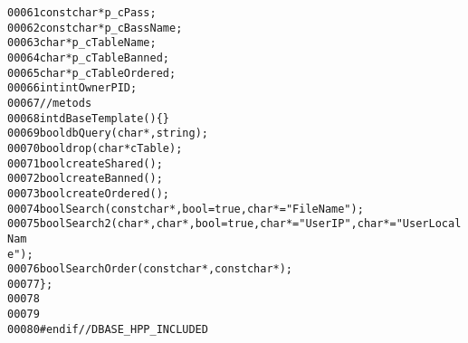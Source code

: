 \begin{footnotesize}
\begin{alltt}
00061         \textcolor{keyword}{const} \textcolor{keywordtype}{char} *p\_cPass; 
00062         \textcolor{keyword}{const} \textcolor{keywordtype}{char} *p\_cBassName; 
00063         \textcolor{keywordtype}{char} *p\_cTableName; 
00064         \textcolor{keywordtype}{char} *p\_cTableBanned; 
00065         \textcolor{keywordtype}{char} *p\_cTableOrdered;
00066         \textcolor{keywordtype}{int} intOwnerPID; 
00067         \textcolor{comment}{//metods}
00068         \textcolor{keywordtype}{int} dBaseTemplate()\{\}
00069         \textcolor{keywordtype}{bool} dbQuery(\textcolor{keywordtype}{char} *,\textcolor{keywordtype}{string});
00070         \textcolor{keywordtype}{bool} drop(\textcolor{keywordtype}{char} *cTable);
00071         \textcolor{keywordtype}{bool} createShared();
00072         \textcolor{keywordtype}{bool} createBanned();
00073         \textcolor{keywordtype}{bool} createOrdered();
00074         \textcolor{keywordtype}{bool} Search(\textcolor{keyword}{const} \textcolor{keywordtype}{char} *,\textcolor{keywordtype}{bool} =\textcolor{keyword}{true},\textcolor{keywordtype}{char} * =\textcolor{stringliteral}{"FileName"});
00075         \textcolor{keywordtype}{bool} Search2(\textcolor{keywordtype}{char} *,\textcolor{keywordtype}{char}*,\textcolor{keywordtype}{bool} =\textcolor{keyword}{true},\textcolor{keywordtype}{char}* =\textcolor{stringliteral}{"UserIP"},\textcolor{keywordtype}{char}* =\textcolor{stringliteral}{"UserLocalNam
      e"});
00076         \textcolor{keywordtype}{bool} SearchOrder(\textcolor{keyword}{const} \textcolor{keywordtype}{char}*,\textcolor{keyword}{const} \textcolor{keywordtype}{char}*);
00077 \};
00078 
00079 
00080 \textcolor{preprocessor}{#endif // DBASE\_HPP\_INCLUDED}
\end{alltt}\end{footnotesize}
